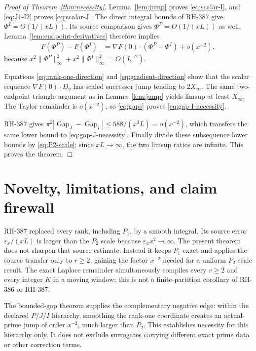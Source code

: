 \documentclass[11pt]{article}
\theoremstyle{definition}
\theoremstyle{remark}
\newcommand{\eps}{\varepsilon}
\newcommand{\PhiP}{\Phi^{P}}
\newcommand{\PhiI}{\Phi^{I}}
\newcommand{\GapJ}{\operatorname{Gap}_{J}}
\newcommand{\GapI}{\operatorname{Gap}_{I}}
\begin{document}
\begin{proof}[Proof of Theorem~\ref{thm:necessity}]
Lemma~\ref{lem:jump} proves \eqref{eq:scalar-I}, and
\eqref{eq:J1-I2} proves \eqref{eq:scalar-J}.  The direct integral bounds
of RH-387 give $\PhiI=O(1/(xL))$.  Its source comparison gives
$\PhiP=O(1/(xL))$ as well.  Lemma~\ref{lem:endpoint-derivatives} therefore
implies
\begin{align*}
 F(\PhiP)-F(\PhiI)
 &=\nabla F(0)\mathbin{\cdot}(\PhiP-\PhiI)+o(x^{-2}),
\end{align*}
because $x^2\|\PhiP\|_\infty^2+x^2\|\PhiI\|_\infty^2=O(L^{-2})$.

Equations \eqref{eq:rank-one-direction} and
\eqref{eq:gradient-direction} show that the scalar sequence
$\nabla F(0)\cdot D_y$ has scaled successor jump tending to
$2X_\infty$.  The same two-endpoint triangle argument as in
Lemma~\ref{lem:jump} yields limsup at least $X_\infty$.  The Taylor
remainder is $o(x^{-2})$, so \eqref{eq:gaps} proves
\eqref{eq:gap-I-necessity}.

RH-387 gives
$\pi^2|\GapJ-\GapI|\le588/(x^3L)=o(x^{-2})$, which transfers the same
lower bound to \eqref{eq:gap-J-necessity}.  Finally divide these
subsequence lower bounds by \eqref{eq:P2-scale}; since $xL\to\infty$,
the two limsup ratios are infinite.  This proves the theorem.
\end{proof}

\section{Novelty, limitations, and claim firewall}

RH-387 replaced every rank, including $P_1$, by a smooth integral.  Its
source error $\eps_x/(xL)$ is larger than the $P_2$ scale because
$\eps_xx^2\to\infty$.  The present theorem does not sharpen that source
estimate.  Instead it keeps $P_1$ exact and applies the source transfer
only to $r\ge2$, gaining the factor $x^{-2}$ needed for a uniform
$P_2$-scale result.  The exact Laplace remainder simultaneously compiles
every $r\ge2$ and every integer $K$ in a moving window; this is not a
finite-partition corollary of RH-386 or RH-387.

The bounded-gap theorem supplies the complementary negative edge:
within the declared $P/J/I$ hierarchy, smoothing the rank-one coordinate
creates an actual-prime jump of order $x^{-2}$, much larger than $P_2$.
This establishes necessity for this hierarchy only.  It does not exclude
surrogates carrying different exact prime data or other correction terms.
\end{document}
